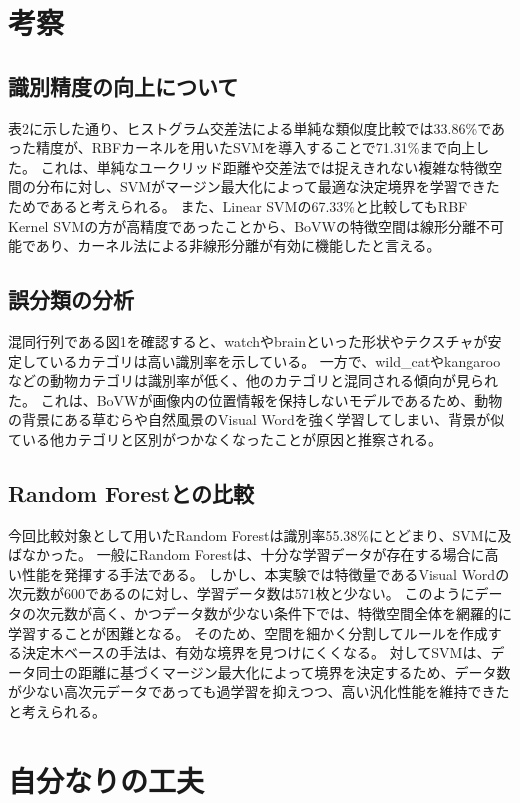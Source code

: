 \documentclass[a4paper,11pt]{jsarticle}
\begin{document}
\section{考察}

\subsection*{識別精度の向上について}
表2に示した通り、ヒストグラム交差法による単純な類似度比較では33.86\%であった精度が、RBFカーネルを用いたSVMを導入することで71.31\%まで向上した。
これは、単純なユークリッド距離や交差法では捉えきれない複雑な特徴空間の分布に対し、SVMがマージン最大化によって最適な決定境界を学習できたためであると考えられる。
また、Linear SVMの67.33\%と比較してもRBF Kernel SVMの方が高精度であったことから、BoVWの特徴空間は線形分離不可能であり、カーネル法による非線形分離が有効に機能したと言える。

\subsection*{誤分類の分析}
混同行列である図1を確認すると、watchやbrainといった形状やテクスチャが安定しているカテゴリは高い識別率を示している。
一方で、wild\_catやkangarooなどの動物カテゴリは識別率が低く、他のカテゴリと混同される傾向が見られた。
これは、BoVWが画像内の位置情報を保持しないモデルであるため、動物の背景にある草むらや自然風景のVisual Wordを強く学習してしまい、背景が似ている他カテゴリと区別がつかなくなったことが原因と推察される。

\subsection*{Random Forestとの比較}
今回比較対象として用いたRandom Forestは識別率55.38\%にとどまり、SVMに及ばなかった。
一般にRandom Forestは、十分な学習データが存在する場合に高い性能を発揮する手法である。
しかし、本実験では特徴量であるVisual Wordの次元数が600であるのに対し、学習データ数は571枚と少ない。
このようにデータの次元数が高く、かつデータ数が少ない条件下では、特徴空間全体を網羅的に学習することが困難となる。
そのため、空間を細かく分割してルールを作成する決定木ベースの手法は、有効な境界を見つけにくくなる。
対してSVMは、データ同士の距離に基づくマージン最大化によって境界を決定するため、データ数が少ない高次元データであっても過学習を抑えつつ、高い汎化性能を維持できたと考えられる。

\section{自分なりの工夫}
\end{document}
